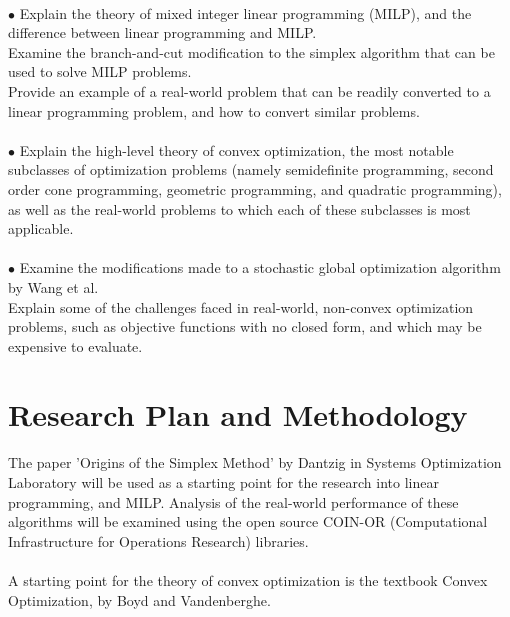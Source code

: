 \documentclass[11pt]{article}
\begin{document}
	\paragraph*{}$\bullet$ Explain the theory of mixed integer linear programming (MILP)\cite{Padberg1991}, and the difference between linear programming and MILP.
	\\Examine the branch-and-cut\cite{Padberg1991} modification to the simplex algorithm that can be used to solve MILP problems. 
	\\Provide an example of a real-world problem that can be readily converted to a linear programming problem, and how to convert similar problems.
	\paragraph*{}$\bullet$ Explain the high-level theory of convex optimization, the most notable subclasses of optimization problems (namely semidefinite programming, second order cone programming, geometric programming, and quadratic programming)\cite{bixbybrief}\cite{boyd_vandenberghe_2004}, as well as the real-world problems to which each of these subclasses is most applicable.
	\paragraph*{}$\bullet$ Examine the modifications made to a stochastic global optimization algorithm by Wang et al.\cite{mps}\cite{montecarlo} 
	\\Explain some of the challenges faced in real-world, non-convex optimization problems, such as objective functions with no closed form, and which may be expensive to evaluate.
	\section{Research Plan and Methodology}
	The paper 'Origins of the Simplex Method' by Dantzig in Systems Optimization Laboratory\cite{10.1145/87252.88081} will be used as a starting point for the research into linear programming, and MILP. Analysis of the real-world performance of these algorithms will be examined using the open source COIN-OR (Computational Infrastructure for Operations Research) libraries.
	\paragraph*{}A starting point for the theory of convex optimization is the textbook Convex Optimization, by Boyd and Vandenberghe\cite{boyd_vandenberghe_2004}. 
\end{document}
